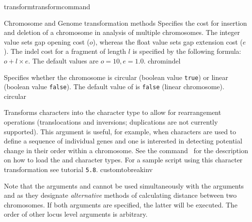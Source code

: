 \begin{command}{transform}{transformcommand}
\begin{arguments}
\begin{argumentgroup}{Chromosome and Genome transformation methods}
                {Specifies the cost for insertion and deletion of a chromosome in analysis of
                multiple chromosomes. The integer value sets gap opening
                cost ($o$), whereas the float value sets gap extension
                cost ($e$).  The indel cost for a fragment of length $l$ is
                specified by the following formula:
                    $o + l \times e$. The default values are $o=10, e=1.0$.}
                {chromindel}
 
                {Specifies whether the chromosome is circular (boolean value
                \texttt{true}) or linear (boolean value \texttt{false}). The
                default value of  is \texttt{false}
                (linear chromosome).}
                {circular}
             
                {Transforms  characters into the 
                 character type to allow for 
                rearrangement operations (translocations and inversions; 
                duplications are not currently supported). This argument is useful, for 
                example, when  characters are used 
                to define a sequence of individual genes and one is 
                interested in detecting potential change in their order within a chromosome. 
                See the command~ for the description on how to 
                load the  and  
                character types. For a sample script using this character transformation see tutorial \texttt{5.8}}.
                {customtobreakinv}
             
            \begin{statement}
  		        Note that the arguments  and
                 cannot be used simultaneously
                with the arguments  and
                 as they designate
                \emph{alternative} methods of calculating distance between two
                chromosomes.  If both arguments are specified, the latter will
                be executed. The order of other locus level arguments is
                arbitrary.
		    \end{statement}
		

\end{argumentgroup}
\end{arguments}
\end{command}
